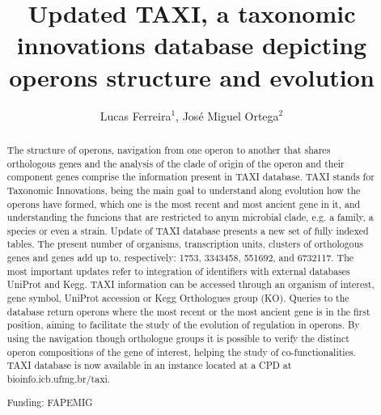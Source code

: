 \documentclass[twoside]{article}
\title{\vspace{-15mm}\fontsize{24pt}{10pt}\selectfont\textbf{Updated TAXI, a taxonomic innovations database depicting operons structure and evolution}} %
\author{Lucas Ferreira$^1$, Jos\'e Miguel Ortega$^2$}
\affil{1 SGC - STRUCTURAL GENOMICS CONSORTIUM, UNICAMP\\ 2 UFMG. LABORAT\'ORIO DE BIODADOS\\ }
\date{}
\begin{document}
\maketitle %

\thispagestyle{fancy} %


\begin{abstract}
The structure of operons, navigation from one operon to another that shares orthologous genes and the analysis of the clade of origin of the operon and their component genes comprise the information present in TAXI database. TAXI stands for Taxonomic Innovations, being the main goal to understand along evolution how the operons have formed, which one is the most recent and most ancient gene in it, and understanding the funcions that are restricted to anym microbial clade, e.g. a family, a species or even a strain. Update of TAXI database presents a new set of fully indexed tables. The present number of organisms, transcription units, clusters of orthologous genes and genes add up to, respectively: 1753, 3343458, 551692, and 6732117. The most important updates refer to integration of identifiers with external databases UniProt and Kegg. TAXI information can be accessed through an organism of interest, gene symbol, UniProt accession or Kegg Orthologues group (KO). Queries to the database return operons where the most recent or the most ancient gene is in the first position, aiming to facilitate the study of the evolution of regulation in operons. By using the navigation though orthologue groups it is possible to verify the distinct operon compositions of the gene of interest, helping the study of co-functionalities. TAXI database is now available in an instance located at a CPD at bioinfo.icb.ufmg.br/taxi.

Funding: FAPEMIG
\end{abstract}
\end{document}

